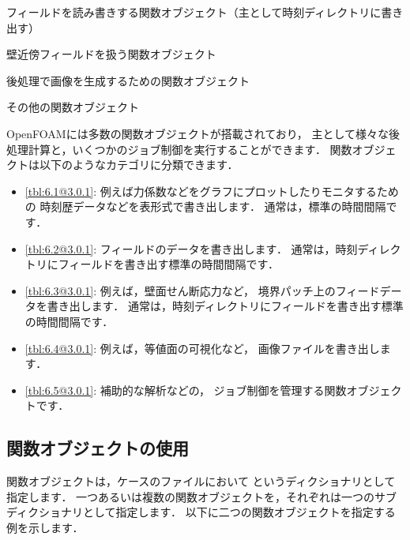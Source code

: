 \begin{table}[ht]
 
 \caption{フィールドを読み書きする関数オブジェクト（主として時刻ディレクトリに書き出す）}
 \label{tbl:6.2@3.0.1}
\end{table}


\begin{table}[ht]
 
 \caption{壁近傍フィールドを扱う関数オブジェクト}
 \label{tbl:6.3@3.0.1}
\end{table}


\begin{table}[ht]
 
 \caption{後処理で画像を生成するための関数オブジェクト}
 \label{tbl:6.4@3.0.1}
\end{table}


\begin{table}[ht]
 
 \caption{その他の関数オブジェクト}
 \label{tbl:6.5@3.0.1}
\end{table}


OpenFOAMには多数の関数オブジェクトが搭載されており，
主として様々な後処理計算と，いくつかのジョブ制御を実行することができます．
関数オブジェクトは以下のようなカテゴリに分類できます．
\begin{itemize}
 \item \autoref{tbl:6.1@3.0.1}: 例えば力係数などをグラフにプロットしたりモニタするための
       時刻歴データなどを表形式で書き出します．
       通常は，標準の時間間隔です．
 \item \autoref{tbl:6.2@3.0.1}: フィールドのデータを書き出します．
       通常は，時刻ディレクトリにフィールドを書き出す標準の時間間隔です．
 \item \autoref{tbl:6.3@3.0.1}: 例えば，壁面せん断応力など，
       境界パッチ上のフィードデータを書き出します．
       通常は，時刻ディレクトリにフィールドを書き出す標準の時間間隔です．
 \item \autoref{tbl:6.4@3.0.1}: 例えば，等値面の可視化など，
       画像ファイルを書き出します．
 \item \autoref{tbl:6.5@3.0.1}: 補助的な解析などの，
       ジョブ制御を管理する関数オブジェクトです．
\end{itemize}


\subsection{関数オブジェクトの使用}
\label{ssec:6.2.1@3.0.1}
関数オブジェクトは，ケースのファイルにおいて
というディクショナリとして指定します．
一つあるいは複数の関数オブジェクトを，それぞれは一つのサブディクショナリとして指定します．
以下に二つの関数オブジェクトを指定する例を示します．

